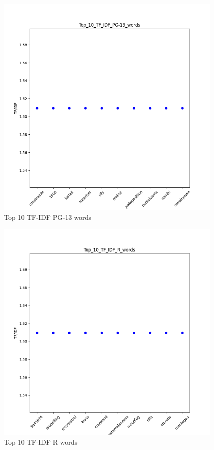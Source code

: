\documentclass[a4paper]{article}
\begin{document}
\begin{figure}[ht]
    \centering
    \includegraphics[width=1\textwidth]{../stats/Top_10_TF_IDF_PG-13_words.png}
    \caption{Top 10 TF-IDF PG-13 words}
\end{figure}

\begin{figure}[ht]
    \centering
    \includegraphics[width=1\textwidth]{../stats/Top_10_TF_IDF_R_words.png}
    \caption{Top 10 TF-IDF R words}
\end{figure}
\end{document}
